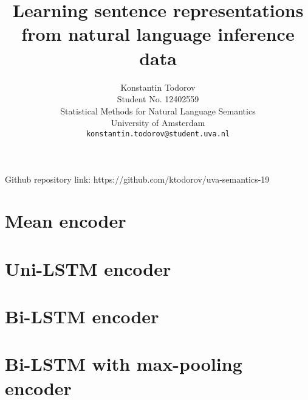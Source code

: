 \documentclass{article}
\title{
  Learning sentence representations from natural language inference data}
\author{%
  Konstantin Todorov \\
  Student No. 12402559 \\
  Statistical Methods for Natural Language Semantics\\
  University of Amsterdam\\
  \texttt{konstantin.todorov@student.uva.nl}
}
\begin{document}
\maketitle

Github repository link: https://github.com/ktodorov/uva-semantics-19

\section{Mean encoder}


\section{Uni-LSTM encoder}


\section{Bi-LSTM encoder}


\section{Bi-LSTM with max-pooling encoder}
\end{document}
